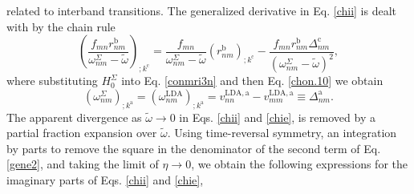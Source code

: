 related to interband transitions. The generalized derivative in Eq. \eqref{chii}
is dealt with by the chain rule
\begin{equation}
\left(\frac{f_{mn}r_{nm}^{\mathrm{b}}}{\omega^\Sigma_{nm}-\tilde\omega}\right)_{;k^{\mathrm{c}}}=
\frac{f_{mn}}{\omega^\Sigma_{nm}-\tilde\omega}\left(r_{nm}^\mathrm{b}\right)_{;k^{\mathrm{c}}}
-\frac{f_{mn}r_{nm}^{\mathrm{b}}\Delta_{nm}^\mathrm{c}}{(\omega^\Sigma_{nm}-\tilde\omega)^2}
,
\label{gene2}
\end{equation}
where substituting $H^\Sigma_0$ into Eq. \eqref{conmri3n} and then Eq.
\eqref{chon.10} we obtain
\begin{equation}\label{eli.13}
\left(\omega^\Sigma_{nm}\right)_{;k^{\mathrm{a}}}
= \left(\omega^\mathrm{LDA}_{nm}\right)_{;k^{\mathrm{a}}}
= v_{nn}^{\mathrm{LDA},\mathrm{a}}
- v_{mm}^{\mathrm{LDA},\mathrm{a}}\equiv\Delta_{nm}^{\mathrm{a}}.
\end{equation} 
The apparent divergence as $\tilde\omega\to 0$ in Eqs. \eqref{chii} and
\eqref{chie}, is removed  by a partial fraction expansion over $\tilde\omega$.
Using time-reversal symmetry, an integration by parts to remove the square in
the denominator of the second term of Eq. \eqref{gene2}, and taking the limit of
$\eta\to 0$, we obtain the following expressions for the imaginary parts of Eqs.
\eqref{chii} and \eqref{chie},
